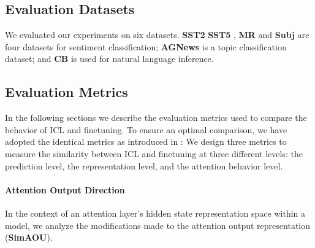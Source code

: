 \subsection{Evaluation Datasets}

We evaluated our experiments on six datasets. \textbf{SST2} \cite{socher-etal-2013-recursive} \textbf{SST5} \cite{socher-etal-2013-recursive}, \textbf{MR} \cite{10.3115/1219840.1219855} and \textbf{Subj} \cite{10.3115/1218955.1218990} are four datasets for sentiment classification; \textbf{AGNews} \cite{NIPS2015_250cf8b5} is a topic classification dataset; and \textbf{CB} \cite{Marneffe2019TheCI} is used
for natural language inference.

\subsection{Evaluation Metrics}

In the following sections we describe the evaluation metrics used to compare the behavior of ICL and finetuning.
To ensure an optimal comparison, we have adopted the identical metrics as introduced in \cite{dai2023gpt}:
We design three metrics to measure the similarity between ICL and finetuning at three different levels: the prediction level, the representation level, and the attention behavior level. 




\paragraph{Attention Output Direction}
In the context of an attention layer's hidden state representation space within a model, we analyze the modifications made to the attention output representation (\textbf{SimAOU}).

